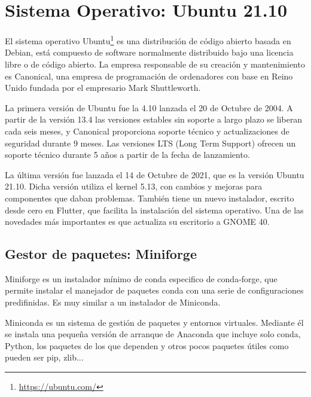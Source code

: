 \documentclass[a4paper, 12pt]{book}
\begin{document}
\section{Sistema Operativo: Ubuntu 21.10} 
\label{sec:sistema_operativo}

El sistema operativo Ubuntu\footnote{\url{https://ubuntu.com/}} es una distribución de código abierto basada en Debian, está compuesto de software normalmente distribuido bajo una licencia libre o de código abierto. La empresa responsable de su creación y mantenimiento es Canonical, una empresa de programación de ordenadores con base en Reino Unido fundada por el empresario Mark Shuttleworth.

La primera versión de Ubuntu fue la 4.10 lanzada el 20 de Octubre de 2004. A partir de la versión 13.4 las versiones estables sin soporte a largo plazo se liberan cada seis meses, y Canonical proporciona soporte técnico y actualizaciones de seguridad durante 9 meses. Las versiones LTS (Long Term Support) ofrecen un soporte técnico durante 5 años a partir de la fecha de lanzamiento.

La última versión fue lanzada el 14 de Octubre de 2021, que es la versión Ubuntu 21.10. Dicha versión utiliza el kernel 5.13, con cambios y mejoras para componentes que daban problemas. También tiene un nuevo instalador, escrito desde cero en Flutter, que facilita la instalación del sistema operativo. Una de las novedades más importantes es que actualiza su escritorio a GNOME 40. 


\subsection{Gestor de paquetes: Miniforge}
\label{subsec:gestor_de_paquetes}


Miniforge es un instalador mínimo de conda especifico de conda-forge, que permite instalar el manejador de paquetes conda con una serie de configuraciones predifinidas. Es muy similar a un instalador de Miniconda.

Miniconda es un sistema de gestión de paquetes y entornos virtuales. Mediante él se instala una pequeña versión de arranque de Anaconda que incluye solo conda, Python, los paquetes de los que dependen y otros pocos paquetes útiles como pueden ser pip, zlib...
\end{document}
